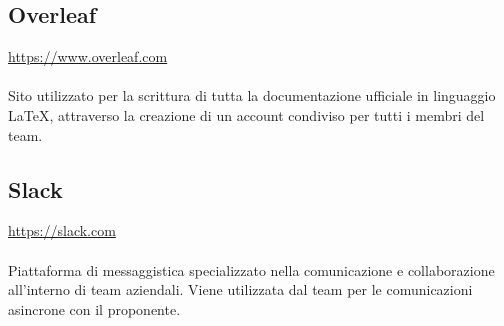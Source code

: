 \documentclass[10pt, a4paper]{article}
\begin{document}
\subsection{Overleaf}
\href{https://www.overleaf.com}{https://www.overleaf.com}\\\\
Sito utilizzato per la scrittura di tutta la documentazione ufficiale in linguaggio LaTeX, attraverso la creazione di un account condiviso per tutti i membri del team.

\subsection{Slack}
\href{https://slack.com}{https://slack.com}\\\\
Piattaforma di messaggistica specializzato nella comunicazione e collaborazione all'interno di team aziendali. Viene utilizzata dal team per le comunicazioni asincrone con il proponente.
\end{document}
